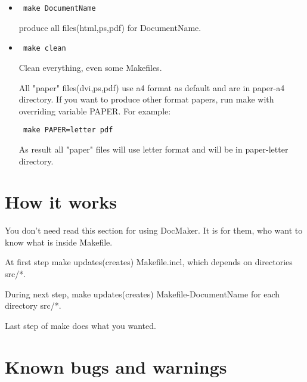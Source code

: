 \documentclass{howto}
\begin{document}
\begin{itemize}
  \item \begin{verbatim} make DocumentName \end{verbatim}

produce all files(html,ps,pdf) for DocumentName.

  \item \begin{verbatim} make clean \end{verbatim}

Clean everything, even some Makefiles.


All "paper" files(dvi,ps,pdf) use a4 format as default and are in paper-a4
directory. If you want to produce other format papers, run make with
overriding variable PAPER. For example:
 
\begin{verbatim} make PAPER=letter pdf \end{verbatim}
As result all "paper" files will use letter format and will be in paper-letter
directory.  

\end{itemize}

\section{How it works}

You don't need read this section for using DocMaker. It is for them, who
want to know what is inside Makefile.

At first step make updates(creates) Makefile.incl, which depends on directories
src/*.


During next step, make updates(creates) Makefile-DocumentName for each directory
src/*.

Last step of make does what you wanted. 

\section{Known bugs and warnings}
\end{document}
